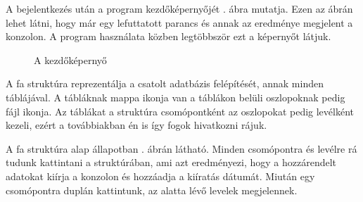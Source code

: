 A bejelentkezés után a program kezdőképernyőjét . ábra mutatja. Ezen az ábrán lehet látni, hogy már egy lefuttatott parancs és annak az eredménye megjelent a konzolon. A program használata közben legtöbbször ezt a képernyőt látjuk.

\begin{figure} [H]
	\centering
	\caption{A kezdőképernyő}
	\label{fig:program}
\end{figure}


A fa struktúra reprezentálja a csatolt adatbázis felépítését, annak minden táblájával. A tábláknak mappa ikonja van a táblákon belüli oszlopoknak pedig fájl ikonja. Az táblákat a struktúra csomópontként az oszlopokat pedig levélként kezeli, ezért a továbbiakban én is így fogok hivatkozni rájuk.

A fa struktúra alap állapotban . ábrán látható. Minden csomópontra és levélre rá tudunk kattintani a struktúrában, ami azt eredményezi, hogy a hozzárendelt adatokat kiírja a konzolon és hozzáadja a kiíratás dátumát. Miután egy csomópontra duplán kattintunk, az alatta lévő levelek megjelennek.

